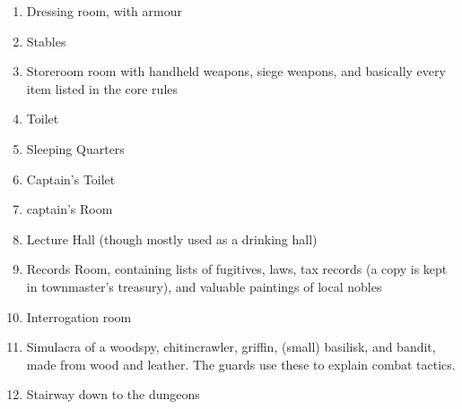 \begin{multicols}{2}
\begin{enumerate}
  \item
  Dressing room, with armour
  \label{stationDressing}
  \item
  Stables\label{stationStables}
  \item
  Storeroom room with handheld weapons, siege weapons, and basically every item listed in the core rules
  \label{stationStorage}
  \item
  Toilet
  \label{stationToilet}
  \item
  Sleeping Quarters
  \label{stationSleep}
  \item
  Captain's Toilet
  \label{stationCaptainToilet}
  \item
  \gls{captain}'s Room
  \label{stationCaptainRoom}
  \item
  Lecture Hall (though mostly used as a drinking hall)
  \label{stationLecture}
  \item
  Records Room, containing lists of fugitives, laws, tax records (a copy is kept in \gls{townmaster}'s treasury), and valuable paintings of local nobles
  \label{stationRecords}
  \item
  Interrogation room
  \label{stationInterrogation}
  \item
  Simulacra of a woodspy, chitincrawler, griffin, (small) basilisk, and bandit, made from wood and leather.
  The guards use these to explain combat tactics.
  \label{stationShrine}
  \item
  Stairway down to the dungeons
  \label{stationStairs}
\end{enumerate}


\end{multicols}
